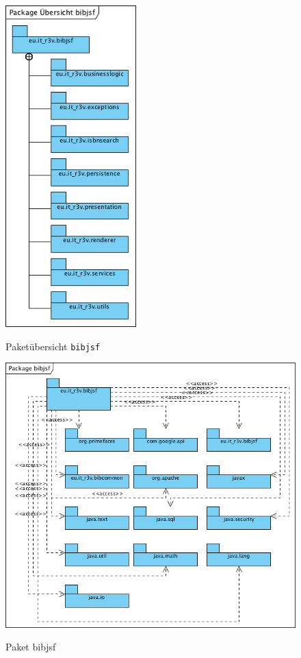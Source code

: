 \documentclass[fontsize=12pt,paper=a4,twoside]{scrartcl}
\begin{document}
\begin{figure} [H] 
\caption{Paketübersicht \texttt{bibjsf}} \centering
	\includegraphics[width=0.45\textwidth]{Diagramme/Packagebibjsfuebersicht.png} 
	\label{pic:PackagebibjsfUebersicht} 
\end{figure}

\begin{figure} [H] 
\caption{Paket bibjsf} \centering
	\includegraphics[width=1\textwidth]{Diagramme/Packagebibjsf.png} 
	\label{pic:PackagebibjsfUebersicht} 
\end{figure}
\end{document}
